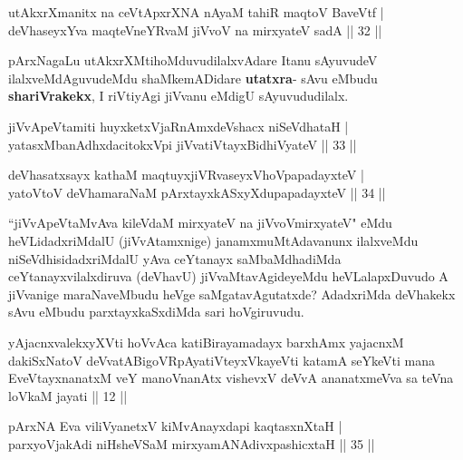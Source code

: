 \begin{shl}
utAkxrXmanitx na ceVtApxrXNA nAyaM tahiR maqtoV BaveVtf |\\
deVhaseyxYva maqteVneYRvaM jiVvoV na mirxyateV sadA \hfill || 32 ||
\end{shl}

\begin{artha}
pArxNagaLu utAkxrXMtihoMduvudilalxvAdare Itanu sAyuvudeV ilalxveMdAguvudeMdu shaMkemADidare \textbf{utatxra}- sAvu eMbudu \textbf{shariVrakekx}, I riVtiyAgi jiVvanu eMdigU sAyuvududilalx. 
\end{artha}


\begin{shl}
jiVvApeVtamiti huyxketxVjaRnAmxdeVshacx niSeVdhataH |\\
yatasxMbanAdhxdacitokxV\s pi jiVvatiVtayxBidhiVyateV \hfill || 33 ||
\end{shl}

\begin{shl}
deVhasatxsayx kathaM maqtuyxjiVRvaseyxVhoVpapadayxteV |\\
yatoV\s toV deVhamaraNaM pArxtayxkASxyXdupapadayxteV \hfill || 34 ||
\end{shl}

\begin{artha}
``jiVvApeVtaMvAva kileVdaM mirxyateV na jiVvoVmirxyateV" eMdu heVLidadxriMdalU (jiVvAtamxnige) janamxmuMtAdavanunx ilalxveMdu niSeVdhisidadxriMdalU yAva ceYtanayx saMbaMdhadiMda ceYtanayxvilalxdiruva (deVhavU) 
jiVvaMtavAgideyeMdu heVLalapxDuvudo A jiVvanige maraNaveMbudu heVge 
saMgatavAgutatxde? AdadxriMda deVhakekx sAvu eMbudu parxtayxkaSxdiMda sari hoVgiruvudu.
\end{artha}


\begin{kandikeshl}
yAjacnxvalekxyXVti hoVvAca katiBirayamadayx barxhAmx yajacnxM dakiSxNatoV deVvatABigoVRpAyatiVteyxVkayeVti katamA seYkeVti mana EveVtayxnanatxM veY manoV\s nanAtx vishevxV deVvA ananatxmeVva sa teVna loVkaM jayati || 12 ||
\end{kandikeshl}


\begin{shl}
pArxNA Eva viliVyanetxV kiMvA\s nayxdapi kaqtasxnXtaH |\\
parxyoVjakAdi niHsheVSaM mirxyamANAdivxpashicxtaH \hfill || 35 ||
\end{shl}

